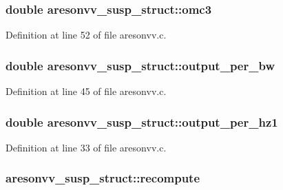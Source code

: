 \subsubsection[{\texorpdfstring{omc3}{omc3}}]{\setlength{\rightskip}{0pt plus 5cm}double aresonvv\+\_\+susp\+\_\+struct\+::omc3}\hypertarget{structaresonvv__susp__struct_a5701f314cd9bccf2daa999d055b73a1c}{}\label{structaresonvv__susp__struct_a5701f314cd9bccf2daa999d055b73a1c}


Definition at line 52 of file aresonvv.\+c.

\subsubsection[{\texorpdfstring{output\+\_\+per\+\_\+bw}{output_per_bw}}]{\setlength{\rightskip}{0pt plus 5cm}double aresonvv\+\_\+susp\+\_\+struct\+::output\+\_\+per\+\_\+bw}\hypertarget{structaresonvv__susp__struct_a54f98c045322111ab099d7b679a95d5f}{}\label{structaresonvv__susp__struct_a54f98c045322111ab099d7b679a95d5f}


Definition at line 45 of file aresonvv.\+c.

\subsubsection[{\texorpdfstring{output\+\_\+per\+\_\+hz1}{output_per_hz1}}]{\setlength{\rightskip}{0pt plus 5cm}double aresonvv\+\_\+susp\+\_\+struct\+::output\+\_\+per\+\_\+hz1}\hypertarget{structaresonvv__susp__struct_a399660bfcd5f2a9791220eaafbd207d3}{}\label{structaresonvv__susp__struct_a399660bfcd5f2a9791220eaafbd207d3}


Definition at line 33 of file aresonvv.\+c.

\subsubsection[{\texorpdfstring{recompute}{recompute}}]{ aresonvv\+\_\+susp\+\_\+struct\+::recompute}\hypertarget{structaresonvv__susp__struct_a04fc265721b1dc94eb75741631c7fa6e}{}\label{structaresonvv__susp__struct_a04fc265721b1dc94eb75741631c7fa6e}


